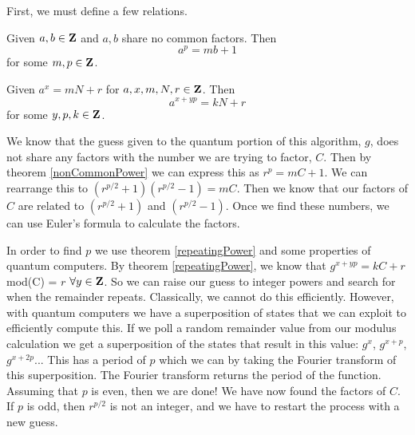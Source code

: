 \documentclass[a4paper]{article}
\begin{document}
First, we must define a few relations. 

\begin{theorem} %

Given $a,b \in \mathbf{Z}$ and $a,b$ share no common factors. Then 
$$a^p = mb + 1$$
for some $m,p \in \mathbf{Z}$.
\label{nonCommonPower}
\end{theorem}

\begin{theorem} %

Given $a^x = mN + r$ for $a,x,m,N,r \in \mathbf{Z}$. Then
$$a^{x + yp} = kN + r$$
for some $y,p,k \in \mathbf{Z}$.
\label{repeatingPower}
\end{theorem}

We know that the guess given to the quantum portion of this algorithm, $g$, does not share any factors with the number we are trying to factor, $C$. Then by theorem \ref{nonCommonPower} we can express this as $r^p = mC + 1$. We can rearrange this to $(r^{p/2} + 1)(r^{p/2} - 1) = mC$. Then we know that our factors of $C$ are related to $(r^{p/2} + 1)$ and $(r^{p/2} - 1)$. Once we find these numbers, we can use Euler's formula to calculate the factors. 

In order to find $p$ we use theorem \ref{repeatingPower} and some properties of quantum computers. By theorem \ref{repeatingPower}, we know that $g^{x + yp} = kC + r$ mod(C) = $r$ $\forall y \in \mathbf{Z}$. So we can raise our guess to integer powers and search for when the remainder repeats. Classically, we cannot do this efficiently. However, with quantum computers we have a superposition of states that we can exploit to efficiently compute this. If we poll a random remainder value from our modulus calculation we get a superposition of the states that result in this value: $g^{x}$, $g^{x + p}$, $g^{x+2p}$... This has a period of $p$ which we can by taking the Fourier transform of this superposition. The Fourier transform returns the period of the function. Assuming that $p$ is even, then we are done! We have now found the factors of $C$. If $p$ is odd, then $r^{p/2}$ is not an integer, and we have to restart the process with a new guess. 
\end{document}
